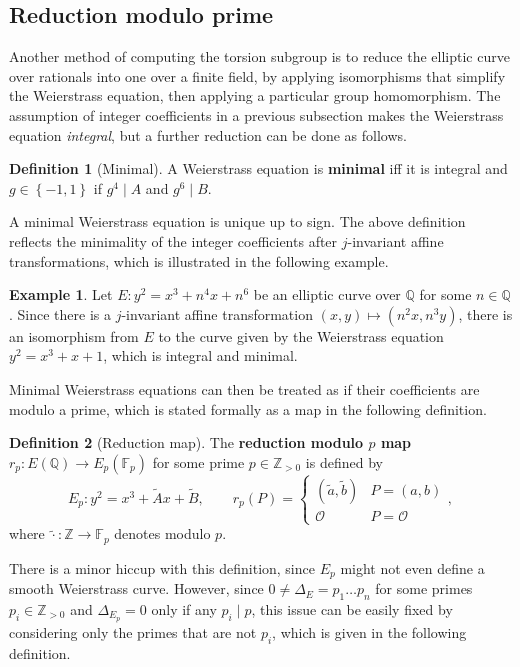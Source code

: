 \documentclass{article}
\newcommand{\F}{\mathbb{F}}
\newcommand{\Z}{\mathbb{Z}}
\newcommand{\Q}{\mathbb{Q}}
\newcommand{\rb}[1]{\left( #1 \right)}
\newcommand{\cb}[1]{\left\{ #1 \right\}}
\theoremstyle{definition}
\newtheorem*{definition}{Definition}
\newtheorem*{example}{Example}
\begin{document}
\pagebreak

\subsection{Reduction modulo prime}

Another method of computing the torsion subgroup is to reduce the elliptic curve over rationals into one over a finite field, by applying isomorphisms that simplify the Weierstrass equation, then applying a particular group homomorphism. The assumption of integer coefficients in a previous subsection makes the Weierstrass equation \emph{integral}, but a further reduction can be done as follows.

\begin{definition}[Minimal]
A Weierstrass equation is \textbf{minimal} iff it is integral and $ g \in \cb{-1, 1} $ if $ g^4 \mid A $ and $ g^6 \mid B $.
\end{definition}

A minimal Weierstrass equation is unique up to sign. The above definition reflects the minimality of the integer coefficients after $ j $-invariant affine transformations, which is illustrated in the following example.

\begin{example}
Let $ E : y^2 = x^3 + n^4x + n^6 $ be an elliptic curve over $ \Q $ for some $ n \in \Q $. Since there is a $ j $-invariant affine transformation $ \rb{x, y} \mapsto \rb{n^2x, n^3y} $, there is an isomorphism from $ E $ to the curve given by the Weierstrass equation $ y^2 = x^3 + x + 1 $, which is integral and minimal.
\end{example}

Minimal Weierstrass equations can then be treated as if their coefficients are modulo a prime, which is stated formally as a map in the following definition.

\begin{definition}[Reduction map]
The \textbf{reduction modulo $ p $ map} $ r_p : E\rb{\Q} \to E_p\rb{\F_p} $ for some prime $ p \in \Z_{> 0} $ is defined by
$$ E_p : y^2 = x^3 + \tilde{A}x + \tilde{B}, \qquad r_p\rb{P} = \begin{cases} \rb{\tilde{a}, \tilde{b}} & P = \rb{a, b} \\ \mathcal{O} & P = \mathcal{O} \end{cases}, $$
where $ \tilde{\cdot} : \Z \to \F_p $ denotes modulo $ p $.
\end{definition}

There is a minor hiccup with this definition, since $ E_p $ might not even define a smooth Weierstrass curve. However, since $ 0 \ne \Delta_E = p_1 \dots p_n $ for some primes $ p_i \in \Z_{> 0} $ and $ \Delta_{E_p} = 0 $ only if any $ p_i \mid p $, this issue can be easily fixed by considering only the primes that are not $ p_i $, which is given in the following definition.
\end{document}
